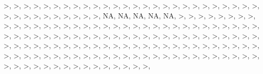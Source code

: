 \documentclass[12pt,]{article}
\begin{document}
\textgreater{}, \textgreater{}, \textgreater{}, \textgreater{},
\textgreater{}, \textgreater{}, \textgreater{}, \textgreater{},
\textgreater{}, \textgreater{}, \textgreater{}, \textgreater{},
\textgreater{}, \textgreater{}, \textgreater{}, \textgreater{},
\textgreater{}, \textgreater{}, \textgreater{}, \textgreater{},
\textgreater{}, \textgreater{}, \textgreater{}, \textgreater{},
\textgreater{}, \textgreater{}, \textgreater{}, \textgreater{},
\textgreater{}, \textgreater{}, \textgreater{}, \textgreater{},
\textgreater{}, \textgreater{}, \textgreater{}, \textgreater{}, NA, NA,
NA, NA, NA, \textgreater{}, \textgreater{}, \textgreater{},
\textgreater{}, \textgreater{}, \textgreater{}, \textgreater{},
\textgreater{}, \textgreater{}, \textgreater{}, \textgreater{},
\textgreater{}, \textgreater{}, \textgreater{}, \textgreater{},
\textgreater{}, \textgreater{}, \textgreater{}, \textgreater{},
\textgreater{}, \textgreater{}, \textgreater{}, \textgreater{},
\textgreater{}, \textgreater{}, \textgreater{}, \textgreater{},
\textgreater{}, \textgreater{}, \textgreater{}, \textgreater{},
\textgreater{}, \textgreater{}, \textgreater{}, \textgreater{},
\textgreater{}, \textgreater{}, \textgreater{}, \textgreater{},
\textgreater{}, \textgreater{}, \textgreater{}, \textgreater{},
\textgreater{}, \textgreater{}, \textgreater{}, \textgreater{},
\textgreater{}, \textgreater{}, \textgreater{}, \textgreater{},
\textgreater{}, \textgreater{}, \textgreater{}, \textgreater{},
\textgreater{}, \textgreater{}, \textgreater{}, \textgreater{},
\textgreater{}, \textgreater{}, \textgreater{}, \textgreater{},
\textgreater{}, \textgreater{}, \textgreater{}, \textgreater{},
\textgreater{}, \textgreater{}, \textgreater{}, \textgreater{},
\textgreater{}, \textgreater{}, \textgreater{}, \textgreater{},
\textgreater{}, \textgreater{}, \textgreater{}, \textgreater{},
\textgreater{}, \textgreater{}, \textgreater{}, \textgreater{},
\textgreater{}, \textgreater{}, \textgreater{}, \textgreater{},
\textgreater{}, \textgreater{}, \textgreater{}, \textgreater{},
\textgreater{}, \textgreater{}, \textgreater{}, \textgreater{},
\textgreater{}, \textgreater{}, \textgreater{}, \textgreater{},
\textgreater{}, \textgreater{}, \textgreater{}, \textgreater{},
\textgreater{}, \textgreater{}, \textgreater{}, \textgreater{},
\textgreater{}, \textgreater{}, \textgreater{}, \textgreater{},
\textgreater{}, \textgreater{}, \textgreater{}, \textgreater{},
\textgreater{}, \textgreater{}, \textgreater{}, \textgreater{},
\textgreater{}, \textgreater{}, \textgreater{}, \textgreater{},
\textgreater{}, \textgreater{}, \textgreater{}, \textgreater{},
\end{document}
